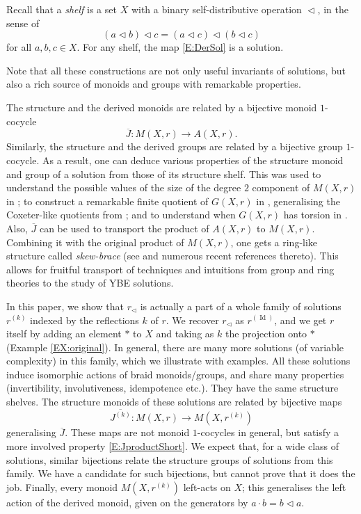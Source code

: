 \documentclass{amsart}
\newcommand{\Id}{\operatorname{Id}}
\newcommand\op{\mathrel{\triangleleft}}
\theoremstyle{plain}
\theoremstyle{definition}
\theoremstyle{remark}
\begin{document}
Recall that a \emph{shelf} is a set $X$ with a binary self-distributive operation $\op$, in the sense of 
\[(a \op b) \op c = (a \op c) \op (b \op c)\]
for all $a,b,c \in X$. For any shelf, the map \eqref{E:DerSol} is a solution.

Note that all these constructions are not only useful invariants of solutions, but also a rich source of monoids and groups with remarkable properties.

The structure and the derived monoids are related by a bijective monoid $1$-cocycle
\[\overline{J} \colon M(X,r) \to A(X,r).\]
Similarly, the structure and the derived groups are related by a bijective group $1$-cocycle. As a result, one can deduce various properties of the structure monoid and group of a solution from those of its structure shelf. This was used to understand the possible values of the size of the degree $2$ component of $M(X,r)$ in \cite{CJO_Minimality}; to construct a remarkable finite quotient of $G(X,r)$ in \cite{LV_StrGroups}, generalising the Coxeter-like quotients from \cite{DehCycleSet}; and to understand when $G(X,r)$ has torsion in \cite{JKVAV20}. Also, $\overline{J}$ can be used to transport the product of $A(X,r)$ to $M(X,r)$. Combining it with the original product of $M(X,r)$, one gets a ring-like structure called \emph{skew-brace} (see \cite{SkewBraces} and numerous recent references thereto). This allows for fruitful transport of techniques and intuitions from group and ring theories to the study of YBE solutions. 

In this paper, we show that $r_{\op}$ is actually a part of a whole family of solutions $r^{(k)}$ indexed by the reflections $k$ of $r$. We recover $r_{\op}$ as $r^{(\Id)}$, and we get $r$ itself by adding an element $*$ to $X$ and taking as $k$ the projection onto $*$ (Example \ref{EX:original}). In general, there are many more solutions (of variable complexity) in this family, which we illustrate with examples. All these solutions induce isomorphic actions of braid monoids/groups, and share many properties (invertibility, involutiveness, idempotence etc.). They have the same structure shelves. The structure monoids of these solutions are related by bijective maps
\[\overline{J^{(k)}} \colon M(X,r) \to M(X,r^{(k)})\]
generalising $\overline{J}$. These maps are not monoid $1$-cocycles in general, but satisfy a more involved property \eqref{E:JproductShort}. We expect that, for a wide class of solutions, similar bijections relate the structure groups of solutions from this family. We have a candidate for such bijections, but cannot prove that it does the job. %
 Finally, every monoid $M(X,r^{(k)})$ left-acts on $X$; this generalises the left action of the derived monoid, given on the generators by $a \cdot b = b \op a$.
\end{document}
